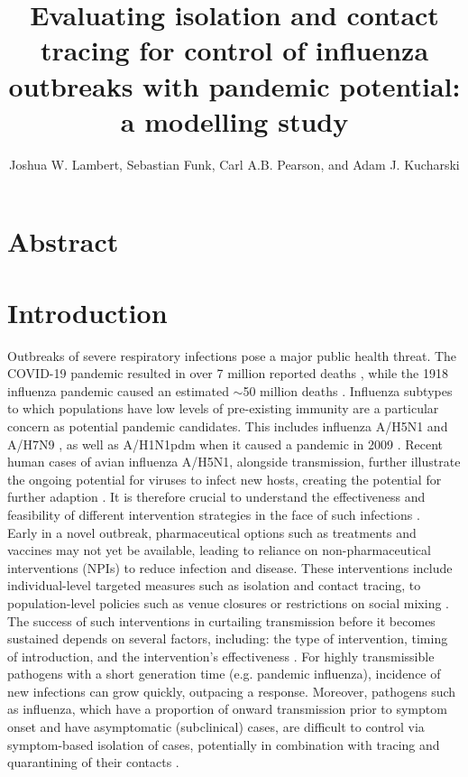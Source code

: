 \documentclass{article}
\title{Evaluating isolation and contact tracing for control of influenza outbreaks with pandemic potential: a modelling study}
\author{Joshua W. Lambert, Sebastian Funk, Carl A.B. Pearson, and Adam J. Kucharski}
\date{}
\begin{document}
\maketitle

\section*{Abstract}

\section*{Introduction}

Outbreaks of severe respiratory infections pose a major public health threat. The COVID-19 pandemic resulted in over 7 million reported deaths \citep{whocovid-19dashboardCOVID19DeathsWHO}, while the 1918 influenza pandemic caused an estimated $\sim$50 million deaths \citep{johnsonUpdatingAccountsGlobal2002}. Influenza subtypes to which populations have low levels of pre-existing immunity are a particular concern as potential pandemic candidates. This includes influenza A/H5N1 \citep{Ward2024.12.11.24318702} and A/H7N9 \citep{tannerPandemicPotentialAvian2015}, as well as A/H1N1pdm when it caused a pandemic in 2009 \citep{fraserPandemicPotentialStrain2009}. Recent human cases of avian influenza A/H5N1, alongside transmission, further illustrate the ongoing potential for viruses to infect new hosts, creating the potential for further adaption \citep{antiaRoleEvolutionEmergence2003, gargHighlyPathogenicAvian2025, peacockGlobalH5N1Influenza2025}. It is therefore crucial to understand the effectiveness and feasibility of different intervention strategies in the face of such infections \citep{fraserFactorsThatMake2004, kucharskiControllingMinorOutbreaks2024}. \\

Early in a novel outbreak, pharmaceutical options such as treatments and vaccines may not yet be available, leading to reliance on non-pharmaceutical interventions (NPIs) to reduce infection and disease. These interventions include individual-level targeted measures such as isolation and contact tracing, to population-level policies such as venue closures or restrictions on social mixing \citep{haugRankingEffectivenessWorldwide2020, sharmaUnderstandingEffectivenessGovernment2021}. The success of such interventions in curtailing transmission before it becomes sustained depends on several factors, including: the type of intervention, timing of introduction, and the intervention's effectiveness \citep{longiniContainingPandemicInfluenza2005}. For highly transmissible pathogens with a short generation time (e.g. pandemic influenza), incidence of new infections can grow quickly, outpacing a response. Moreover, pathogens such as influenza, which have a proportion of onward transmission prior to symptom onset and have asymptomatic (subclinical) cases, are difficult to control via symptom-based isolation of cases, potentially in combination with tracing and quarantining of their contacts \citep{fraserFactorsThatMake2004}. \\
\end{document}
